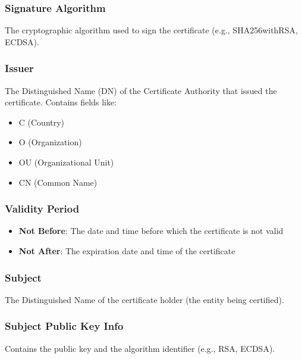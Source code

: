 \documentclass[12pt,a4paper]{article}
\begin{document}
\subsubsection{Signature Algorithm}
The cryptographic algorithm used to sign the certificate (e.g., SHA256withRSA, ECDSA).

\subsubsection{Issuer}
The Distinguished Name (DN) of the Certificate Authority that issued the certificate. Contains fields like:
\begin{itemize}
    \item C (Country)
    \item O (Organization)
    \item OU (Organizational Unit)
    \item CN (Common Name)
\end{itemize}

\subsubsection{Validity Period}
\begin{itemize}
    \item \textbf{Not Before}: The date and time before which the certificate is not valid
    \item \textbf{Not After}: The expiration date and time of the certificate
\end{itemize}

\subsubsection{Subject}
The Distinguished Name of the certificate holder (the entity being certified).

\subsubsection{Subject Public Key Info}
Contains the public key and the algorithm identifier (e.g., RSA, ECDSA).
\end{document}
